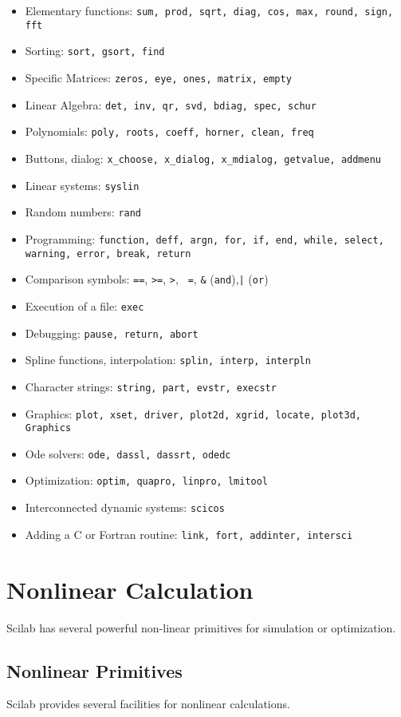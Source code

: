\begin{itemize}
\item{Elementary functions: {\tt sum, prod, sqrt, diag, cos, max, round, sign, fft}}
\item{Sorting: {\tt sort, gsort, find}}
\item{Specific Matrices: {\tt zeros, eye, ones, matrix, empty}}
\item{Linear Algebra: {\tt det, inv, qr, svd, bdiag, spec, schur}}
\item{Polynomials}: {\tt poly, roots, coeff, horner, clean, freq}
\item{Buttons, dialog: \verb!x_choose, x_dialog, x_mdialog, getvalue, addmenu!}
\item{Linear systems: {\tt syslin}}
\item{Random numbers: {\tt rand}}
\item{Programming: {\tt function, deff, argn, for, if, end, while, 
select, warning, error, break, return}}
\item{Comparison symbols: {\tt ==}, {\tt >=}, {\tt >}, {\tt ~=}, {\verb!&!}
({\tt and}),{\tt |} ({\tt or})}
\item{Execution of a file: {\tt exec}}
\item{Debugging: {\tt pause, return, abort}}
\item{Spline functions, interpolation: {\tt splin, interp, interpln}}
\item{Character strings: {\tt string, part, evstr, execstr}}
\item{Graphics: {\tt plot, xset, driver, plot2d, xgrid, locate, plot3d, Graphics}}
\item{Ode solvers: {\tt ode, dassl, dassrt, odedc}}
\item{Optimization: {\tt optim, quapro, linpro, lmitool}}
\item{Interconnected dynamic systems: {\tt scicos}}
\item{Adding a C or Fortran routine: {\tt link, fort, addinter, intersci}}
\end{itemize}


\section{Nonlinear Calculation}
\label{ch6}

	Scilab has several powerful non-linear primitives for simulation
or optimization.
\subsection{Nonlinear Primitives}
Scilab provides several facilities for nonlinear calculations.

